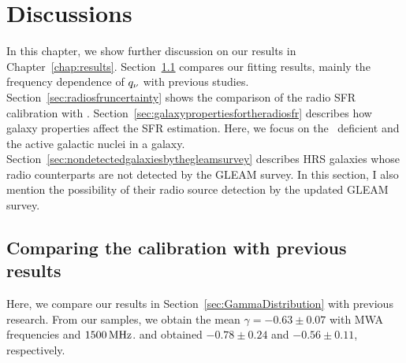 \chapter{Discussions}\label{chap:discussions}
\begin{chapabstract}

In this chapter, we show further discussion on our results in Chapter~\ref{chap:results}.
Section~\ref{sec:comparingthecalibration} compares our fitting results, mainly the frequency dependence of $q_{\nu}$ with previous studies.
Section~\ref{sec:radiosfruncertainty} shows the comparison of the radio SFR calibration with \citet{CalistroRivera2017a}.
Section~\ref{sec:galaxypropertiesfortheradiosfr} describes how galaxy properties affect the SFR estimation.
Here, we focus on the \nh~deficient and the active galactic nuclei in a galaxy.
Section~\ref{sec:nondetectedgalaxiesbythegleamsurvey} describes HRS galaxies whose radio counterparts are not detected by the GLEAM survey.
In this section, I also mention the possibility of their radio source detection by the updated GLEAM survey.

\end{chapabstract}

\section{Comparing the calibration with previous results}\label{sec:comparingthecalibration}

Here, we compare our results in Section~\ref{sec:GammaDistribution} with previous research.
From our samples, we obtain the mean $\gamma=-0.63 \pm 0.07$ with MWA frequencies and $1500\,\mathrm{MHz}$.
\citet{CalistroRivera2017a} and \citet{Chyzy2018} obtained $-0.78 \pm 0.24$ and $-0.56 \pm 0.11$, respectively.


